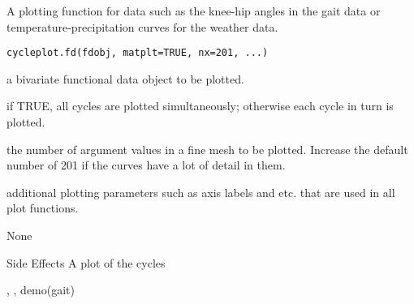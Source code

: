 \documentclass{article}
\begin{document}
\begin{Description}\relax
A plotting function for data such as the knee-hip angles in
the gait data or temperature-precipitation curves for the
weather data.
\end{Description}
\begin{Usage}
\begin{verbatim}
cycleplot.fd(fdobj, matplt=TRUE, nx=201, ...)
\end{verbatim}
\end{Usage}
\begin{Arguments}
\begin{ldescription}
\item[\code{fdobj}] a bivariate functional data object to be plotted.

\item[\code{matplt}] if TRUE, all cycles are plotted simultaneously; otherwise
each cycle in turn is plotted.

\item[\code{nx}] the number of argument values in a fine mesh to be
plotted.  Increase the default number of 201 if
the curves have a lot of detail in them.

\item[\code{... }] additional plotting parameters such as axis labels and
etc. that are used in all plot functions.

\end{ldescription}
\end{Arguments}
\begin{Value}
None
\end{Value}
\begin{Section}{Side Effects}
A plot of the cycles
\end{Section}
\begin{SeeAlso}\relax
{}, 
, 
demo(gait)
\end{SeeAlso}
\end{document}
